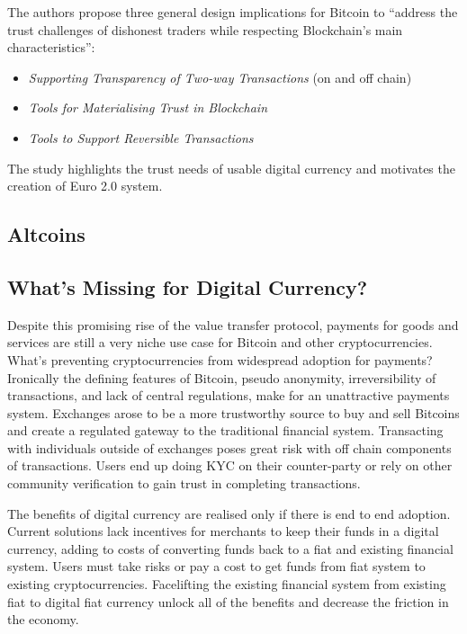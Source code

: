 \documentclass[12pt]{article} %
\begin{document}
The authors propose three general design implications for Bitcoin to ``address the trust challenges of dishonest traders while respecting Blockchain's main characteristics''\cite{sas2016design}:
\begin{itemize}
	\item \textit{Supporting Transparency of Two-way Transactions} (on and off chain)
	\item \textit{Tools for Materialising Trust in Blockchain}
	\item \textit{Tools to Support Reversible Transactions}
\end{itemize}

The study highlights the trust needs of usable digital currency and motivates the creation of Euro 2.0 system.

\subsection{Altcoins}

\subsection{What's Missing for Digital Currency?}
Despite this promising rise of the value transfer protocol, payments for goods and services are still a very niche use case for Bitcoin and other cryptocurrencies. What's preventing cryptocurrencies from widespread adoption for payments? Ironically the defining features of Bitcoin, pseudo anonymity, irreversibility of transactions, and lack of central regulations, make for an unattractive payments system. Exchanges arose to be a more trustworthy source to buy and sell Bitcoins and create a regulated gateway to the traditional financial system. Transacting with individuals outside of exchanges poses great risk with off chain components of transactions. Users end up doing KYC on their counter-party or rely on other community verification to gain trust in completing transactions.



The benefits of digital currency are realised only if there is end to end adoption. Current solutions lack incentives for merchants to keep their funds in a digital currency, adding to costs of converting funds back to a fiat and existing financial system. Users must take risks or pay a cost to get funds from fiat system to existing cryptocurrencies. Facelifting the existing financial system from existing fiat to digital fiat currency unlock all of the benefits and decrease the friction in the economy.
\end{document}

